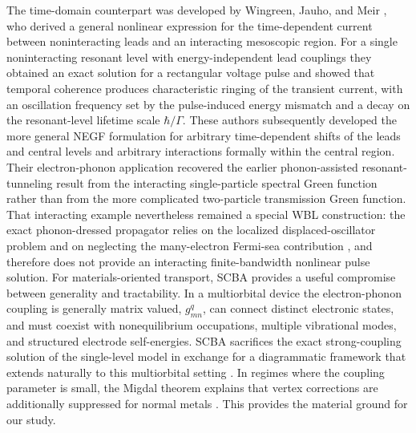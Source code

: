 \documentclass[
 reprint,
 superscriptaddress,
 amsmath,amssymb,
 aps,prb,
 longbibliography,
 floatfix
]{revtex4-2}
\begin{document}
The time-domain counterpart was developed by Wingreen, Jauho, and Meir \cite{WingreenJauhoMeir1993}, who derived a general nonlinear expression for the time-dependent current between noninteracting leads and an interacting mesoscopic region. For a single noninteracting resonant level with energy-independent lead couplings they obtained an exact solution for a rectangular voltage pulse and showed that temporal coherence produces characteristic ringing of the transient current, with an oscillation frequency set by the pulse-induced energy mismatch and a decay on the resonant-level lifetime scale $\hbar/\Gamma$. These authors subsequently developed the more general NEGF formulation for arbitrary time-dependent shifts of the leads and central levels and arbitrary interactions formally within the central region. Their electron-phonon application recovered the earlier phonon-assisted resonant-tunneling result from the interacting single-particle spectral Green function rather than from the more complicated two-particle transmission Green function. That interacting example nevertheless remained a special WBL construction: the exact phonon-dressed propagator relies on the localized displaced-oscillator problem and on neglecting the many-electron Fermi-sea contribution \cite{JauhoWingreenMeir1994}, and therefore does not provide an interacting finite-bandwidth nonlinear pulse solution. For materials-oriented transport, SCBA provides a useful compromise between generality and tractability. In a multiorbital device the electron-phonon coupling is generally matrix valued, $g_{mn}^{q}$, can connect distinct electronic states, and must coexist with nonequilibrium occupations, multiple vibrational modes, and structured electrode self-energies. SCBA sacrifices the exact strong-coupling solution of the single-level model in exchange for a diagrammatic framework that extends naturally to this multiorbital setting \cite{Frederiksen2007}. In regimes where the coupling parameter is small, the Migdal theorem explains that vertex corrections are additionally suppressed for normal metals \cite{Migdal1958}. This provides the material ground for our study.
\end{document}
